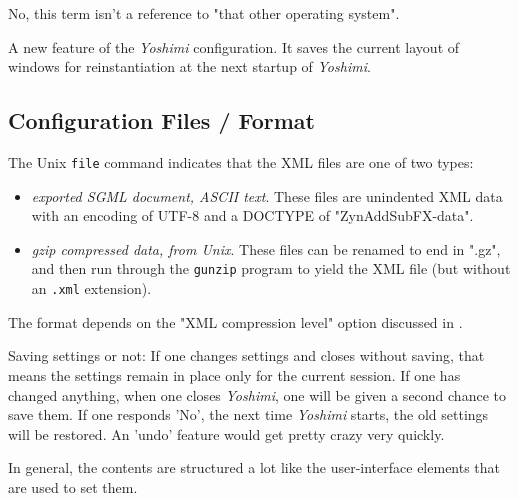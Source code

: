    No, this term isn't a reference to "that other operating system".

   A new feature of the \textsl{Yoshimi} configuration.  It saves the current
   layout of windows for reinstantiation at the next startup of
   \textsl{Yoshimi}.

\subsection{Configuration Files / Format}
\label{subsec:configuration_file_format}

   The Unix \texttt{file} command indicates that the XML files are one of
   two types:

   \begin{itemize}
      \item \textsl{exported SGML document, ASCII text}.
         These files are unindented XML data with an encoding of UTF-8 and
         a DOCTYPE of "ZynAddSubFX-data".
      \item \textsl{gzip compressed data, from Unix}.
         These files can be renamed to end in ".gz", and then run through
         the \texttt{gunzip} program to yield the XML file (but without an
         \texttt{.xml} extension).
   \end{itemize}

   The format depends on the "XML compression level" option discussed in
   .

   Saving settings or not:
   If one changes settings and closes without saving, that means the settings
   remain in place only for the current session. If one has changed anything,
   when one closes \textsl{Yoshimi}, one will be given a second chance to
   save them. If one responds 'No',  the next time \textsl{Yoshimi} starts,
   the old settings will be restored.  An 'undo' feature would get pretty
   crazy very quickly.

   In general, the contents are structured a lot like the
   user-interface elements that are used to set them.

